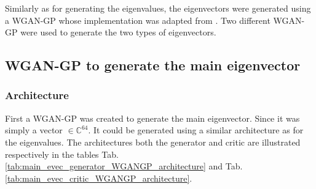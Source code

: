\documentclass{article}
\begin{document}


Similarly as for generating the eigenvalues, the eigenvectors were generated using a WGAN-GP whose implementation was adapted from \cite{nain2020wgangp}. Two different WGAN-GP were used to generate the two types of eigenvectors.

\subsection{WGAN-GP to generate the main eigenvector}

\subsubsection{Architecture}

First a WGAN-GP was created to generate the main eigenvector. Since it was simply a vector $\in \mathbb{C}^{64}$. It could be generated using a similar architecture as for the eigenvalues. The architectures both the generator and critic are illustrated respectively in the tables Tab.\ref{tab:main_evec_generator_WGANGP_architecture} and Tab.\ref{tab:main_evec_critic_WGANGP_architecture}.
\end{document}
